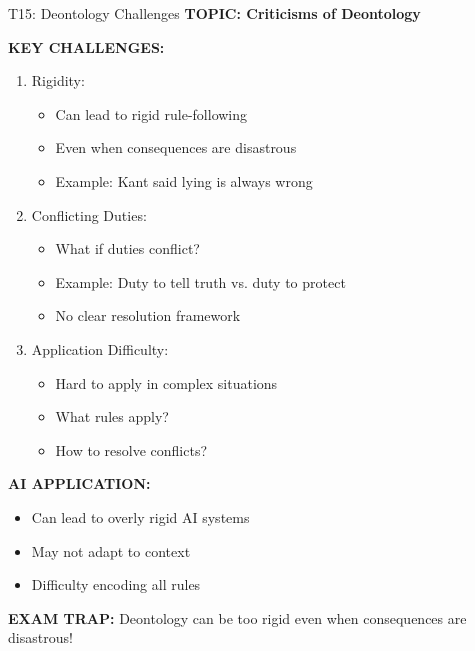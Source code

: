 \documentclass[8pt]{beamer}
\begin{document}
	\begin{frame}{T15: Deontology Challenges}
		\fontsize{6.5}{7.5}\selectfont
		\textbf{TOPIC: Criticisms of Deontology}
		
		\vspace{0.1cm}
		\textbf{KEY CHALLENGES:}
		\begin{enumerate}
			\item \textcolor{myblue}{Rigidity:}
			\begin{itemize}
				\item Can lead to rigid rule-following
				\item Even when consequences are disastrous
				\item Example: Kant said lying is always wrong
			\end{itemize}
			\item \textcolor{myblue}{Conflicting Duties:}
			\begin{itemize}
				\item What if duties conflict?
				\item Example: Duty to tell truth vs. duty to protect
				\item No clear resolution framework
			\end{itemize}
			\item \textcolor{myblue}{Application Difficulty:}
			\begin{itemize}
				\item Hard to apply in complex situations
				\item What rules apply?
				\item How to resolve conflicts?
			\end{itemize}
		\end{enumerate}
		
		\vspace{0.1cm}
		\textbf{AI APPLICATION:}
		\begin{itemize}
			\item Can lead to overly rigid AI systems
			\item May not adapt to context
			\item Difficulty encoding all rules
		\end{itemize}
		
		\textcolor{myred}{\textbf{EXAM TRAP:}} Deontology can be \textcolor{myblue}{too rigid} even when consequences are disastrous!
	\end{frame}
	
	
\end{document}
